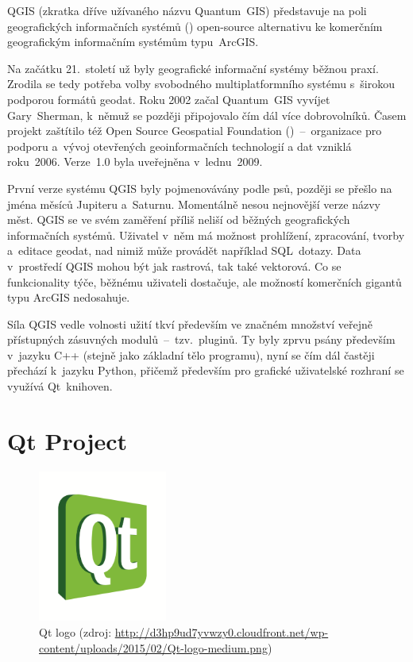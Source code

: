QGIS (zkratka dříve užívaného názvu Quantum~GIS) představuje na poli
geogra\-fic\-kých informačních systémů () open-source
alternativu ke komerčním geografic\-kým informačním systémům
typu~ArcGIS.

Na začátku 21.~století už byly geografické informační systémy běžnou
praxí. Zrodila se tedy potřeba volby svobodného multiplatformního
systému s~širokou podporou formátů geodat. Roku 2002 začal Quantum~GIS
vyvíjet Gary~Sherman, k~němuž se později připojovalo čím dál více
dobrovolníků. Časem projekt zaštítilo též Open Source Geospatial
Foundation ()~–~organizace pro podporu a~vývoj otevřených
geoinformačních technologií a dat vzniklá roku~2006. Verze~1.0 byla
uveřejněna v~lednu~2009.

První verze systému QGIS byly pojmenovávány podle psů, později se
přešlo na jména měsíců Jupiteru a~Saturnu. Momentálně nesou nejnovější
verze názvy měst.  QGIS se ve svém zaměření příliš neliší od běžných
geografických informačních systémů. Uživatel v~něm má možnost
prohlížení, zpracování, tvorby a~editace geodat, nad nimiž může
provádět například SQL~dotazy. Data v~prostředí QGIS mohou být jak
rastrová, tak také vektorová. Co se funkcionality týče, běžnému
uživateli dostačuje, ale možností komerčních gigantů typu ArcGIS
nedosahuje.

Síla QGIS vedle volnosti užití tkví především ve značném množství
veřejně přístupných zásuvných modulů~–~tzv.~pluginů. Ty byly zprvu
psány především v~jazyku C++ (stejně jako základní tělo programu),
nyní se čím dál častěji přechází k~jazyku Python, přičemž především
pro grafické uživatelské rozhraní se využívá Qt~knihoven.



\section{Qt Project}
\label{qt}

  \begin{figure}[H]
    \centering
      \includegraphics[width=120pt]{./pictures/qt.png}
      \caption[Qt logo]{Qt logo 
      (zdroj: \url{http://d3hp9ud7yvwzy0.cloudfront.net/wp-content/uploads/2015/02/Qt-logo-medium.png})}
      \label{fig:qt}
  \end{figure}

